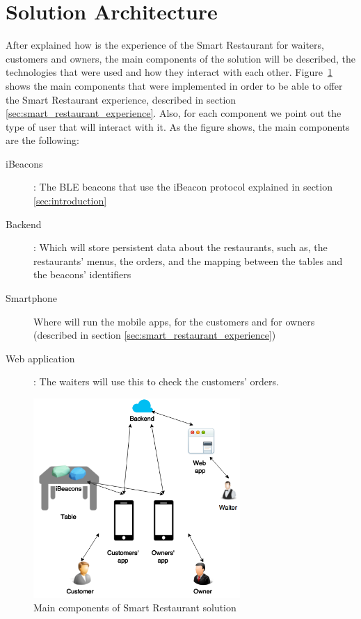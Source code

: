 
\section{Solution Architecture}
\label{sec:solution_architecture}
After explained how is the experience of the Smart Restaurant for waiters,
customers and owners, the main components of the solution will be described,
the technologies that were used and how they interact with each other.
Figure~\ref{fig:architecture_base} shows the main components that were
implemented in order to be able to offer the Smart Restaurant experience,
described in section \ref{sec:smart_restaurant_experience}.
Also, for each component we point out the type of user that will interact
with it.
As the figure shows, the main components are the following:
\begin{description}
  \item[iBeacons]: The BLE beacons that use the iBeacon protocol explained
  in section \ref{sec:introduction}
  \item[Backend]: Which will store persistent data about the restaurants,
  such as, the restaurants' menus, the orders, and the mapping between
  the tables and the beacons' identifiers
  \item[Smartphone] Where will run the mobile apps, for the customers
  and for owners (described in section \ref{sec:smart_restaurant_experience})
  \item[Web application]: The waiters will use this to check the
  customers' orders.
\end{description}

\begin{figure}[!ht]
  \centering
    \includegraphics[width=0.7\textwidth]{figures/architecture_base}
    \caption{Main components of Smart Restaurant solution}
    \label{fig:architecture_base}
\end{figure}

